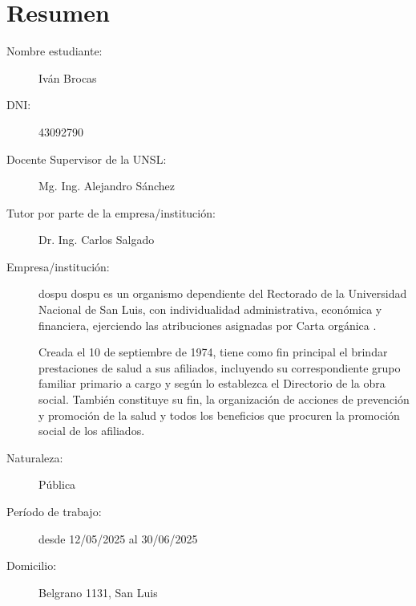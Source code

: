 \section{Resumen}

\begin{description}
    \item[Nombre estudiante:] Iván Brocas
    \item[DNI:] 43092790
    \item[Docente Supervisor de la UNSL:] Mg. Ing. Alejandro Sánchez
    \item[Tutor por parte de la empresa/institución:] Dr. Ing. Carlos Salgado
    \item[Empresa/institución:] \acrfull{dospu}
    \acrshort{dospu} es un organismo dependiente del Rectorado de la Universidad Nacional de San Luis, con individualidad administrativa, económica y financiera, ejerciendo las atribuciones asignadas por Carta orgánica \cite{CSOrd53}.

    Creada el 10 de septiembre de 1974, tiene como fin principal el brindar prestaciones de salud a sus afiliados, incluyendo su correspondiente grupo familiar primario a cargo y según lo establezca el Directorio de la obra social. También constituye su fin, la organización de acciones de prevención y promoción de la salud y todos los beneficios que procuren la promoción social de los afiliados. 
    \item[Naturaleza:] Pública
    \item[Período de trabajo:] desde 12/05/2025 al 30/06/2025
    \item[Domicilio:] Belgrano 1131, San Luis 
\end{description}


